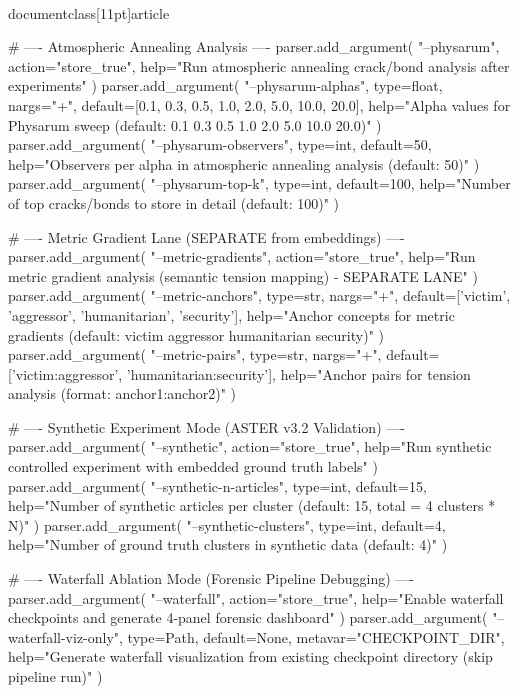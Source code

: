 \\documentclass[11pt]{article}
\begin{document}
\begin{CodeBlock}
    # ---- Atmospheric Annealing Analysis ----
    parser.add_argument(
        "--physarum",
        action="store_true",
        help="Run atmospheric annealing crack/bond analysis after experiments"
    )
    parser.add_argument(
        "--physarum-alphas",
        type=float,
        nargs="+",
        default=[0.1, 0.3, 0.5, 1.0, 2.0, 5.0, 10.0, 20.0],
        help="Alpha values for Physarum sweep (default: 0.1 0.3 0.5 1.0 2.0 5.0 10.0 20.0)"
    )
    parser.add_argument(
        "--physarum-observers",
        type=int,
        default=50,
        help="Observers per alpha in atmospheric annealing analysis (default: 50)"
    )
    parser.add_argument(
        "--physarum-top-k",
        type=int,
        default=100,
        help="Number of top cracks/bonds to store in detail (default: 100)"
    )
    
    # ---- Metric Gradient Lane (SEPARATE from embeddings) ----
    parser.add_argument(
        "--metric-gradients",
        action="store_true",
        help="Run metric gradient analysis (semantic tension mapping) - SEPARATE LANE"
    )
    parser.add_argument(
        "--metric-anchors",
        type=str,
        nargs="+",
        default=['victim', 'aggressor', 'humanitarian', 'security'],
        help="Anchor concepts for metric gradients (default: victim aggressor humanitarian security)"
    )
    parser.add_argument(
        "--metric-pairs",
        type=str,
        nargs="+",
        default=['victim:aggressor', 'humanitarian:security'],
        help="Anchor pairs for tension analysis (format: anchor1:anchor2)"
    )

    # ---- Synthetic Experiment Mode (ASTER v3.2 Validation) ----
    parser.add_argument(
        "--synthetic",
        action="store_true",
        help="Run synthetic controlled experiment with embedded ground truth labels"
    )
    parser.add_argument(
        "--synthetic-n-articles",
        type=int,
        default=15,
        help="Number of synthetic articles per cluster (default: 15, total = 4 clusters * N)"
    )
    parser.add_argument(
        "--synthetic-clusters",
        type=int,
        default=4,
        help="Number of ground truth clusters in synthetic data (default: 4)"
    )

    # ---- Waterfall Ablation Mode (Forensic Pipeline Debugging) ----
    parser.add_argument(
        "--waterfall",
        action="store_true",
        help="Enable waterfall checkpoints and generate 4-panel forensic dashboard"
    )
    parser.add_argument(
        "--waterfall-viz-only",
        type=Path,
        default=None,
        metavar="CHECKPOINT_DIR",
        help="Generate waterfall visualization from existing checkpoint directory (skip pipeline run)"
    )


\end{CodeBlock}
\end{document}
